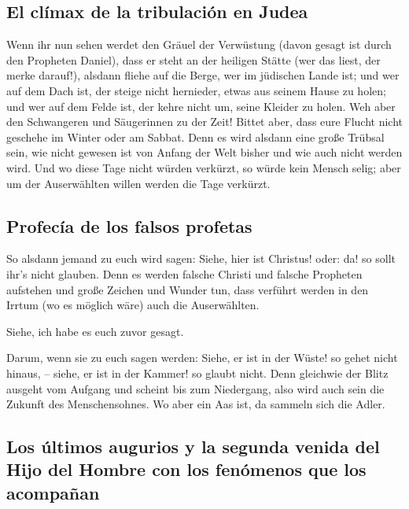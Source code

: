 \hypertarget{el-cluxedmax-de-la-tribulaciuxf3n-en-judea}{%
\subsection{El clímax de la tribulación en
Judea}\label{el-cluxedmax-de-la-tribulaciuxf3n-en-judea}}

 Wenn ihr nun sehen werdet den Gräuel der Verwüstung
(davon gesagt ist durch den Propheten Daniel), dass er steht an der
heiligen Stätte (wer das liest, der merke darauf!), 
alsdann fliehe auf die Berge, wer im jüdischen Lande ist;
 und wer auf dem Dach ist, der steige nicht hernieder,
etwas aus seinem Hause zu holen;  und wer auf dem Felde
ist, der kehre nicht um, seine Kleider zu holen.  Weh
aber den Schwangeren und Säugerinnen zu der Zeit!  Bittet
aber, dass eure Flucht nicht geschehe im Winter oder am Sabbat.
 Denn es wird alsdann eine große Trübsal sein, wie nicht
gewesen ist von Anfang der Welt bisher und wie auch nicht werden wird.
 Und wo diese Tage nicht würden verkürzt, so würde kein
Mensch selig; aber um der Auserwählten willen werden die Tage verkürzt.

\hypertarget{profecuxeda-de-los-falsos-profetas}{%
\subsection{Profecía de los falsos
profetas}\label{profecuxeda-de-los-falsos-profetas}}

 So alsdann jemand zu euch wird sagen: Siehe, hier ist
Christus! oder: da! so sollt ihr's nicht glauben.  Denn
es werden falsche Christi und falsche Propheten aufstehen und große
Zeichen und Wunder tun, dass verführt werden in den Irrtum (wo es
möglich wäre) auch die Auserwählten.

 Siehe, ich habe es euch zuvor gesagt.

 Darum, wenn sie zu euch sagen werden: Siehe, er ist in
der Wüste! so gehet nicht hinaus, -- siehe, er ist in der Kammer! so
glaubt nicht.  Denn gleichwie der Blitz ausgeht vom
Aufgang und scheint bis zum Niedergang, also wird auch sein die Zukunft
des Menschensohnes.  Wo aber ein Aas ist, da sammeln sich
die Adler.

\hypertarget{los-uxfaltimos-augurios-y-la-segunda-venida-del-hijo-del-hombre-con-los-fenuxf3menos-que-los-acompauxf1an}{%
\subsection{Los últimos augurios y la segunda venida del Hijo del Hombre
con los fenómenos que los
acompañan}\label{los-uxfaltimos-augurios-y-la-segunda-venida-del-hijo-del-hombre-con-los-fenuxf3menos-que-los-acompauxf1an}}

